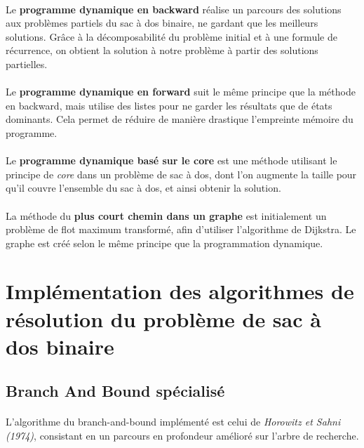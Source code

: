 \documentclass[12pt]{article}
\begin{document}
\paragraph{}Le \textbf{programme dynamique en backward} réalise un parcours des solutions aux problèmes partiels du sac à dos binaire, ne gardant que les meilleurs solutions. Grâce à la décomposabilité du problème initial et à une formule de récurrence, on obtient la solution à notre problème à partir des solutions partielles.

\paragraph{}Le \textbf{programme dynamique en forward} suit le même principe que la méthode en backward, mais utilise des listes pour ne garder les résultats que de états dominants. Cela permet de réduire de manière drastique l'empreinte mémoire du programme.

\paragraph{}Le \textbf{programme dynamique basé sur le core} est une méthode utilisant le principe de \textit{core} dans un problème de sac à dos, dont l'on augmente la taille pour qu'il couvre l'ensemble du sac à dos, et ainsi obtenir la solution.

\paragraph{}La méthode du \textbf{plus court chemin dans un graphe} est initialement un problème de flot maximum transformé, afin d'utiliser l'algorithme de Dijkstra. Le graphe est créé selon le même principe que la programmation dynamique.

\section{Implémentation des algorithmes de résolution du problème de sac à dos binaire}

\subsection{Branch And Bound spécialisé}

\paragraph{}L'algorithme du branch-and-bound implémenté est celui de \textit{Horowitz et Sahni (1974)}, consistant en un parcours en profondeur amélioré sur l'arbre de recherche.
\end{document}

